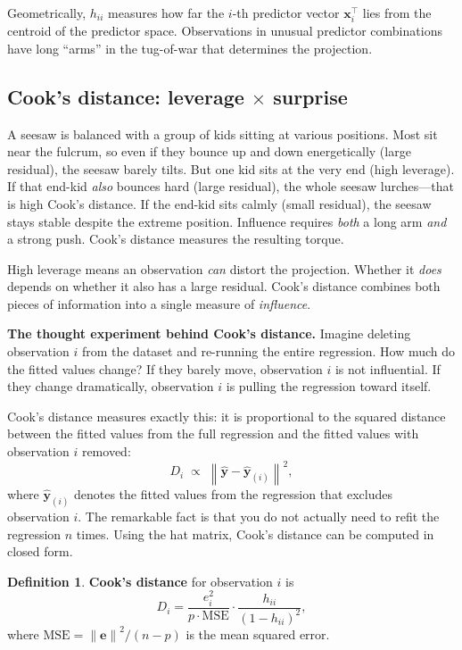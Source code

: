 \documentclass[11pt,a4paper]{article}
\theoremstyle{plain}
\theoremstyle{definition}
\newtheorem{definition}[theorem]{Definition}
\newcommand{\yhat}{\hat{\bm{y}}}
\newcommand{\be}{\bm{e}}
\newcommand{\norm}[1]{\left\lVert #1 \right\rVert}
\begin{document}
Geometrically, $h_{ii}$ measures how far the $i$-th predictor vector
$\bm{x}_i^\top$ lies from the centroid of the predictor space.
Observations in unusual predictor combinations have long ``arms''
in the tug-of-war that determines the projection.

\subsection{Cook's distance: leverage $\times$ surprise}

\begin{toystory}
A seesaw is balanced with a group of kids sitting at various positions.
Most sit near the fulcrum, so even if they bounce up and down
energetically (large residual), the seesaw barely tilts.  But one kid
sits at the very end (high leverage).  If that end-kid \emph{also}
bounces hard (large residual), the whole seesaw lurches---that is high
Cook's distance.  If the end-kid sits calmly (small residual), the
seesaw stays stable despite the extreme position.  Influence requires
\emph{both} a long arm \emph{and} a strong push.  Cook's distance
measures the resulting torque.
\end{toystory}

High leverage means an observation \emph{can} distort the projection.
Whether it \emph{does} depends on whether it also has a large residual.
Cook's distance combines both pieces of information into a single measure of \emph{influence}.

\medskip
\noindent\textbf{The thought experiment behind Cook's distance.}
Imagine deleting observation $i$ from the dataset and re-running the entire regression.
How much do the fitted values change?
If they barely move, observation $i$ is not influential.
If they change dramatically, observation $i$ is pulling the regression toward itself.

Cook's distance measures exactly this: it is proportional to the squared distance between the fitted values from the full regression and the fitted values with observation $i$ removed:
\[
  D_i \;\propto\; \norm{\yhat - \yhat_{(i)}}^2,
\]
where $\yhat_{(i)}$ denotes the fitted values from the regression that excludes observation $i$.
The remarkable fact is that you do not actually need to refit the regression $n$ times.
Using the hat matrix, Cook's distance can be computed in closed form.

\begin{definition}
\textbf{Cook's distance} for observation $i$ is
\[
  D_i = \frac{e_i^2}{p\cdot\text{MSE}}
        \cdot \frac{h_{ii}}{(1 - h_{ii})^2},
\]
where $\text{MSE} = \norm{\be}^2/(n-p)$ is the mean squared error.
\end{definition}
\end{document}
